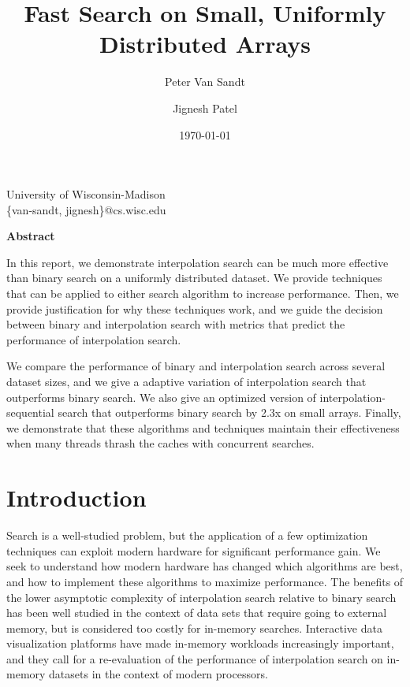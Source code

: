 \documentclass[twocolumn]{article}
\title{Fast Search on Small, Uniformly Distributed Arrays}
\date{\today}
\author{Peter Van Sandt \and Jignesh Patel}
\begin{document}


  \onecolumn
\maketitle
\begin{center}
University of Wisconsin-Madison \\
\{van-sandt, jignesh\}@cs.wisc.edu
\end{center}

\begin{center}
\textbf{Abstract}
\end{center}

In this report, we demonstrate interpolation search can be much more effective than binary search on a uniformly distributed dataset. We provide techniques that can be applied to either search algorithm to increase performance. Then, we provide justification for why these techniques work, and we guide the decision between binary and interpolation search with metrics that predict the performance of interpolation search.

We compare the performance of binary and interpolation search across several dataset sizes, and we give a adaptive variation of interpolation search that outperforms binary search. We also give an optimized version of interpolation-sequential search that outperforms binary search by 2.3x on small arrays. Finally, we demonstrate that these algorithms and techniques maintain their effectiveness when many threads thrash the caches with concurrent searches.

\twocolumn
\section{Introduction}
\label{introduction}
Search is a well-studied problem, but the application of a few optimization techniques can exploit modern hardware for significant performance gain. We seek to understand how modern hardware has changed which algorithms are best, and how to implement these algorithms to maximize performance. The benefits of the lower asymptotic complexity of interpolation search relative to binary search has been well studied in the context of data sets that require going to external memory, but is considered too costly for in-memory searches. \cite{manolopoulos-kollias-burton} Interactive data visualization platforms have made in-memory workloads increasingly important, and they call for a re-evaluation of the performance of interpolation search on in-memory datasets in the context of modern processors.
\end{document}
